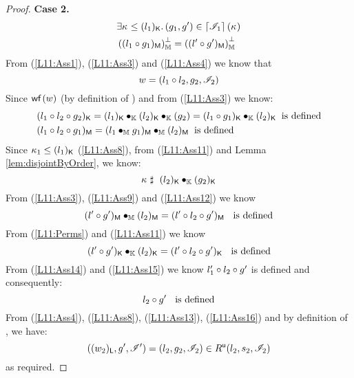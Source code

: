 \begin{lemma}[]
\begin{proof}
\noindent\textbf{Case 2.} 
%
\begin{align}
	& \exists \kappa_{} \leq (l_1)_{\textsf{K}}.\, (g_1, g') \in \left\lceil \mathscr{I}_{1}\right\rceil(\kappa_{}) \label{L11:Ass8} \\
	&\left( (l_1 \circ g_1)_{\textsf{M}}\right)_{\mathbb{M}}^{\bot} = \left( (l' \circ g')_{\textsf{M}}\right)_{\mathbb{M}}^{\bot} \label{L11:Ass9}
\end{align}
%
From (\ref{L11:Ass1}), (\ref{L11:Ass3}) and (\ref{L11:Ass4}) we know that 
%
\begin{equation}
	w = (l_1 \circ l_2, g_2, \mathscr{I}_{2}) \label{L11:Ass10}
\end{equation}
%
Since $\textsf{wf}\left( w \right)$ (by definition of \Worlds) and from (\ref{L11:Ass3}) we know:
\begin{align}
	&\capPart{(l_1 \composeL l_2 \composeL g_2)} = \capPart{(l_1)} \composeCap \capPart{(l_2)} \composeCap {(g_2)} = \capPart{(l_1 \composeL g_1)} \composeCap \capPart{(l_2)}\hspace*{0.2cm} \text{is defined} \label{L11:Ass11}\\
%	
	&\heapPart{(l_1 \composeL l_2 \composeL g_1)} = \heapPart{(l_1 \composeH g_1)} \composeH \heapPart{(l_2)}  \hspace*{0.2cm} \text{is defined} \label{L11:Ass12}
\end{align}
%
Since $\kappa_{1} \leq (l_1)_{\textsf{K}}$ (\ref{L11:Ass8}), from (\ref{L11:Ass11}) and Lemma \ref{lem:disjointByOrder}, we know:
%
\begin{equation}
	\kappa_{} \mathrel{\sharp}\ (l_2)_{\textsf{K}} \bullet_{\mathbb{K}} (g_2)_{\textsf{K}} \label{L11:Ass13}
\end{equation}
%
From (\ref{L11:Ass3}), (\ref{L11:Ass9}) and (\ref{L11:Ass12}) we know
%
\begin{equation}
	(l' \circ g')_{\textsf{M}} \bullet_{\mathbb{M}} (l_2)_{\textsf{M}} = (l' \circ l_2 \circ g')_{\textsf{M}}\hspace*{0.2cm}\text{ is defined} \label{L11:Ass14}
\end{equation}
%
From (\ref{L11:Perms}) and (\ref{L11:Ass11}) we know
%
\begin{equation}
	(l' \circ g')_{\textsf{K}} \bullet_{\mathbb{K}} (l_2)_{\textsf{K}} = (l' \circ l_2 \circ g')_{\textsf{K}}\hspace*{0.2cm}\text{ is defined} \label{L11:Ass15}
\end{equation}
%
From (\ref{L11:Ass14}) and (\ref{L11:Ass15}) we know $l'_1 \circ l_2 \circ g'$ is defined and consequently:
%
\begin{equation}
	l_2 \circ g' \hspace*{0.2cm} \text{ is defined} \label{L11:Ass16}
\end{equation}
%
From (\ref{L11:Ass4}), (\ref{L11:Ass8}), (\ref{L11:Ass13}), (\ref{L11:Ass16}) and by definition of \updateR, we have:
%
\begin{equation*}
	((w_2)_{\textsf{L}}, g', \mathscr{I}') = (l_2, g_2, \mathscr{I}_{2}) \in R^{\textsf{u}}(l_2, s_2, \mathscr{I}_{2})  
\end{equation*}
%
as required.
\end{proof}
%
\end{lemma}
